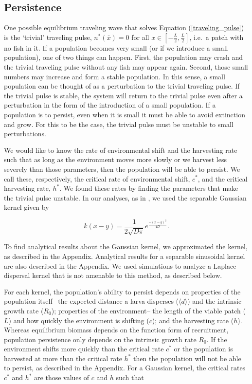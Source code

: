 \documentclass[12pt,english]{article}
\begin{document}
\begin{spacing}{1.9}
\begin{flushleft}
\subsection{Persistence }
One possible equilibrium traveling wave that solves Equation (\ref{traveling_pulse}) is the `trivial' traveling pulse, $n^*(\bar{x}) = 0$ for all $x \in \left[-\frac{L}
{2}, \frac{L}{2}\right]$, i.e.~a patch with no fish in it.  If a population becomes very small (or if we introduce a small 
population), one of two things can happen. First, the population may crash and the trivial traveling pulse 
without any fish may appear again. Second, those small numbers may increase and form a stable population. 
In this sense, a small population can be thought of as a perturbation to the trivial traveling pulse. If the trivial 
pulse is stable, the system will return to the trivial pulse even after a perturbation in the form of the introduction 
of a small population. If a population is to persist, even when it is small it must be able to avoid extinction and 
grow. For this to be the case, the trivial pulse must be unstable to small perturbations.  

We would like to know the rate of environmental shift and the harvesting rate such that as long as the 
environment moves more slowly or we harvest less severely than those parameters, then the population will be able to persist. We call these, respectively, the critical rate of environmental shift, $c^*$, and the critical harvesting rate, $h^*$. 
We found these rates by finding the parameters that make the trivial pulse unstable.   In our analyses, as in \citep{Latore:1998fk}, we used the separable Gaussian kernel given by

\[k(x-y)=\frac{1}{2\sqrt{D\pi}}e^{\frac{-(x-y)^2}{4D}}.\]

\noindent To find analytical results about the Gaussian kernel, we approximated the kernel, as described in the Appendix.  Analytical results for a separable sinusoidal kernel are also described in the Appendix.  We used 
simulations to analyze a Laplace dispersal kernel that is not amenable to this method, as described below.

For each kernel, the population's ability to persist depends on properties of the population itself-- the expected distance a larva disperses ($\langle d \rangle$) and the intrinsic growth rate ($R_0$); properties of the environment-- the length of the viable patch ($L$) and how quickly the environment is shifting ($c$); and the harvesting rate ($h
$).  Whereas equilibrium biomass depends on the function form of recruitment, population persistence only depends on the intrinsic growth rate $R_0$.  If the environment shifts more quickly than the critical rate $c^*$ or the population is harvested at more than the critical rate $h^*$ then the population will not be able to persist, as described in the Appendix.  For a Gaussian kernel, the critical rates $c^*$ and $h^*$ are those values of $c$ and $h$ such that 


\end{flushleft}
\end{spacing}
\end{document}
